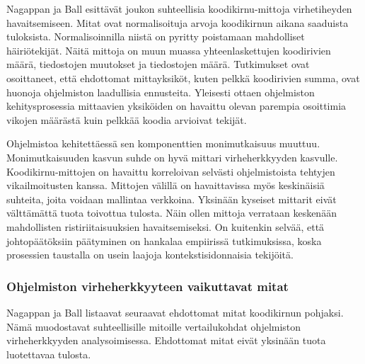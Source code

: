 \documentclass[finnish]{../tktltiki2}
\theoremstyle{definition}
\theoremstyle{remark}
\begin{document}
    Nagappan ja Ball esittävät joukon suhteellisia koodikirnu-mittoja virhetiheyden havaitsemiseen. Mitat ovat 
normalisoituja arvoja koodikirnun aikana saaduista tuloksista. Normalisoinnilla niistä on pyritty poistamaan mahdolliset 
häiriötekijät. Näitä mittoja on muun muassa yhteenlaskettujen koodirivien määrä, tiedostojen muutokset ja tiedostojen 
määrä. Tutkimukset ovat osoittaneet, että ehdottomat mittayksiköt, kuten pelkkä koodirivien summa, ovat huonoja ohjelmiston 
laadullisia ennusteita. Yleisesti ottaen ohjelmiston kehitysprosessia mittaavien yksiköiden on havaittu olevan parempia
osoittimia vikojen määrästä kuin pelkkää koodia arvioivat tekijät.

    Ohjelmistoa kehitettäessä sen komponenttien monimutkaisuus muuttuu. Monimutkaisuuden kasvun suhde on hyvä mittari 
virheherkkyyden kasvulle. Koodikirnu-mittojen on havaittu korreloivan selvästi ohjelmistoista tehtyjen vikailmoitusten 
kanssa. Mittojen välillä on havaittavissa myös keskinäisiä suhteita, joita voidaan mallintaa verkkoina. Yksinään 
kyseiset mittarit eivät välttämättä tuota toivottua tulosta. Näin ollen mittoja verrataan keskenään mahdollisten 
ristiriitaisuuksien havaitsemiseksi. On kuitenkin selvää, että johtopäätöksiin päätyminen on hankalaa empiirissä 
tutkimuksissa, koska prosessien taustalla on usein laajoja kontekstisidonnaisia tekijöitä.

\subsubsection{Ohjelmiston virheherkkyyteen vaikuttavat mitat}

Nagappan ja Ball listaavat seuraavat ehdottomat mitat koodikirnun pohjaksi. Nämä muodostavat suhteellisille mitoille 
vertailukohdat ohjelmiston virheherkkyyden analysoimisessa. Ehdottomat mitat eivät yksinään tuota luotettavaa tulosta.
\end{document}
